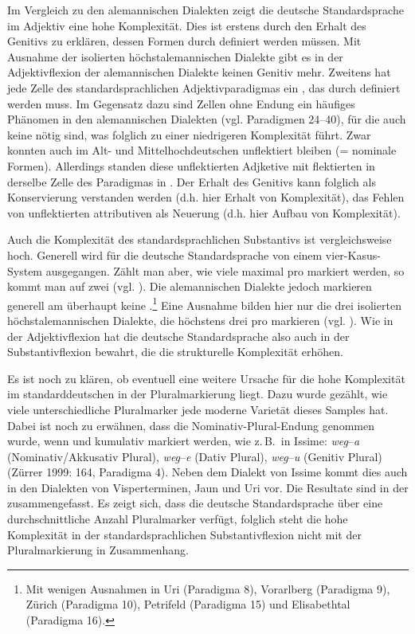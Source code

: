 Im Vergleich zu den alemannischen Dialekten zeigt die deutsche Standardsprache im {Adjektiv} eine hohe Komplexität. Dies ist erstens durch den Erhalt des Genitivs zu erklären, dessen Formen durch  definiert werden müssen. Mit Ausnahme der isolierten höchstalemannischen Dialekte gibt es in der Adjektivflexion der alemannischen Dialekte keinen Genitiv mehr. Zweitens hat jede Zelle des standardsprachlichen Adjektivparadigmas ein , das durch  definiert werden muss. Im Gegensatz dazu sind Zellen ohne Endung ein häufiges Phänomen in den alemannischen Dialekten (vgl. Paradigmen 24–40), für die auch keine  nötig sind, was folglich zu einer niedrigeren Komplexität führt. Zwar konnten  auch im Alt- und Mittelhochdeutschen unflektiert bleiben (= nominale Formen). Allerdings standen diese unflektierten Adjketive mit flektierten  in derselbe Zelle des Paradigmas in . Der Erhalt des Genitivs kann folglich als Konservierung verstanden werden (d.h. hier Erhalt von Komplexität), das Fehlen von unflektierten attributiven  als Neuerung (d.h. hier Aufbau von Komplexität).

Auch die Komplexität des standardsprachlichen {Substantivs} ist vergleichsweise hoch. Generell wird für die deutsche Standardsprache von einem vier-Kasus-System ausgegangen. Zählt man aber, wie viele  maximal pro  markiert werden, so kommt man auf zwei  (vgl. ). Die alemannischen Dialekte jedoch markieren generell am  überhaupt keine .\footnote{Mit wenigen Ausnahmen in Uri (Paradigma 8), Vorarlberg (Paradigma 9), Zürich (Paradigma 10), Petrifeld (Paradigma 15) und Elisabethtal (Paradigma 16).} Eine Ausnahme bilden hier nur die drei isolierten höchstalemannischen Dialekte, die höchstens drei  pro  markieren (vgl. ). Wie in der Adjektivflexion hat die deutsche Standardsprache also auch in der Substantivflexion  bewahrt, die die strukturelle Komplexität erhöhen.

Es ist noch zu klären, ob eventuell eine weitere Ursache für die hohe Komplexität im standarddeutschen  in der Pluralmarkierung liegt. Dazu wurde gezählt, wie viele unterschiedliche Pluralmarker jede moderne Varietät dieses Samples hat. Dabei ist noch zu erwähnen, dass die Nominativ-Plural-Endung genommen wurde, wenn  und  kumulativ markiert werden, wie z.\,B.\ in Issime: \textit{weg}–\textit{a} (Nominativ/Akkusativ Plural), \textit{weg}–\textit{e} (Dativ Plural), \textit{weg}–\textit{u} (Genitiv Plural) (Zürrer 1999: 164, Paradigma 4). Neben dem Dialekt von Issime kommt dies auch in den Dialekten von Visperterminen, Jaun und Uri vor. Die Resultate sind in der  zusammengefasst. Es zeigt sich, dass die deutsche Standardsprache über eine durchschnittliche Anzahl Pluralmarker verfügt, folglich steht die hohe Komplexität in der standardsprachlichen Substantivflexion nicht mit der Pluralmarkierung in Zusammenhang.


